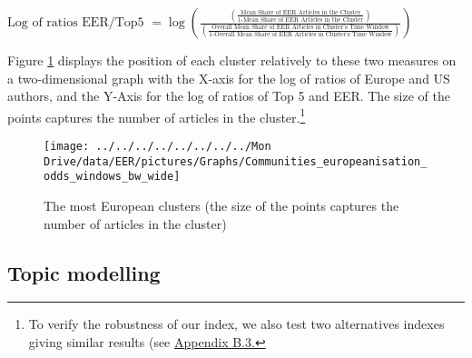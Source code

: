 \documentclass[
  12pt,
  onecolumn]{article}
\begin{document}
\bigskip

\({\scriptstyle \text{Log of ratios EER/Top5 }=\log(\frac{(\frac{\text{Mean Share of EER Articles in the Cluster}}{\text{1-Mean Share of EER Articles in the Cluster}})} {(\frac{\text{Overall Mean Share of EER Articles in Cluster's Time Window}}{\text{1-Overall Mean Share of EER Articles in Cluster's Time Window}})})}\)
\bigskip

Figure \ref{fig:plot-community-diff} displays the position of each
cluster relatively to these two measures on a two-dimensional graph with
the X-axis for the log of ratios of Europe and US authors, and the
Y-Axis for the log of ratios of Top 5 and EER. The size of the points
captures the number of articles in the cluster.\footnote{To verify the
  robustness of our index, we also test two alternatives indexes giving
  similar results (see \protect\hyperlink{alt-index}{Appendix B.3.}}

\begin{figure}[H]

{\centering \texttt{[image: ../../../../../../../../Mon Drive/data/EER/pictures/Graphs/Communities\_europeanisation\_odds\_windows\_bw\_wide]} 

}

\caption{The most European clusters (the size of the points captures the number of articles in the cluster)}\label{fig:plot-community-diff}
\end{figure}

\hypertarget{topic-modelling}{%
\subsection{Topic modelling}\label{topic-modelling}}
\end{document}
